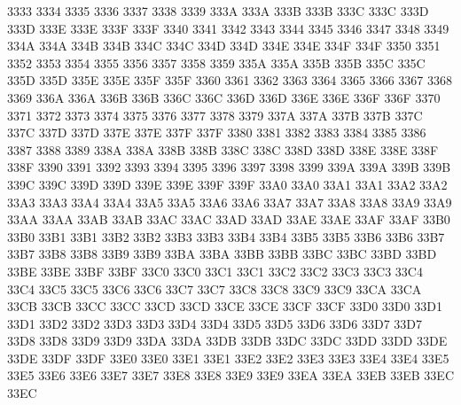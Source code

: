  3333
 3334
 3335
 3336
 3337
 3338
 3339
\ID 333A 333A
\ID 333B 333B
\ID 333C 333C
\ID 333D 333D
\ID 333E 333E
\ID 333F 333F
 3340
 3341
 3342
 3343
 3344
 3345
 3346
 3347
 3348
 3349
\ID 334A 334A
\ID 334B 334B
\ID 334C 334C
\ID 334D 334D
\ID 334E 334E
\ID 334F 334F
 3350
 3351
 3352
 3353
 3354
 3355
 3356
 3357
 3358
 3359
\ID 335A 335A
\ID 335B 335B
\ID 335C 335C
\ID 335D 335D
\ID 335E 335E
\ID 335F 335F
 3360
 3361
 3362
 3363
 3364
 3365
 3366
 3367
 3368
 3369
\ID 336A 336A
\ID 336B 336B
\ID 336C 336C
\ID 336D 336D
\ID 336E 336E
\ID 336F 336F
 3370
 3371
 3372
 3373
 3374
 3375
 3376
 3377
 3378
 3379
\ID 337A 337A
\ID 337B 337B
\ID 337C 337C
\ID 337D 337D
\ID 337E 337E
\ID 337F 337F
 3380
 3381
 3382
 3383
 3384
 3385
 3386
 3387
 3388
 3389
\ID 338A 338A
\ID 338B 338B
\ID 338C 338C
\ID 338D 338D
\ID 338E 338E
\ID 338F 338F
 3390
 3391
 3392
 3393
 3394
 3395
 3396
 3397
 3398
 3399
\ID 339A 339A
\ID 339B 339B
\ID 339C 339C
\ID 339D 339D
\ID 339E 339E
\ID 339F 339F
\ID 33A0 33A0
\ID 33A1 33A1
\ID 33A2 33A2
\ID 33A3 33A3
\ID 33A4 33A4
\ID 33A5 33A5
\ID 33A6 33A6
\ID 33A7 33A7
\ID 33A8 33A8
\ID 33A9 33A9
\ID 33AA 33AA
\ID 33AB 33AB
\ID 33AC 33AC
\ID 33AD 33AD
\ID 33AE 33AE
\ID 33AF 33AF
\ID 33B0 33B0
\ID 33B1 33B1
\ID 33B2 33B2
\ID 33B3 33B3
\ID 33B4 33B4
\ID 33B5 33B5
\ID 33B6 33B6
\ID 33B7 33B7
\ID 33B8 33B8
\ID 33B9 33B9
\ID 33BA 33BA
\ID 33BB 33BB
\ID 33BC 33BC
\ID 33BD 33BD
\ID 33BE 33BE
\ID 33BF 33BF
\ID 33C0 33C0
\ID 33C1 33C1
\ID 33C2 33C2
\ID 33C3 33C3
\ID 33C4 33C4
\ID 33C5 33C5
\ID 33C6 33C6
\ID 33C7 33C7
\ID 33C8 33C8
\ID 33C9 33C9
\ID 33CA 33CA
\ID 33CB 33CB
\ID 33CC 33CC
\ID 33CD 33CD
\ID 33CE 33CE
\ID 33CF 33CF
\ID 33D0 33D0
\ID 33D1 33D1
\ID 33D2 33D2
\ID 33D3 33D3
\ID 33D4 33D4
\ID 33D5 33D5
\ID 33D6 33D6
\ID 33D7 33D7
\ID 33D8 33D8
\ID 33D9 33D9
\ID 33DA 33DA
\ID 33DB 33DB
\ID 33DC 33DC
\ID 33DD 33DD
\ID 33DE 33DE
\ID 33DF 33DF
\ID 33E0 33E0
\ID 33E1 33E1
\ID 33E2 33E2
\ID 33E3 33E3
\ID 33E4 33E4
\ID 33E5 33E5
\ID 33E6 33E6
\ID 33E7 33E7
\ID 33E8 33E8
\ID 33E9 33E9
\ID 33EA 33EA
\ID 33EB 33EB
\ID 33EC 33EC
